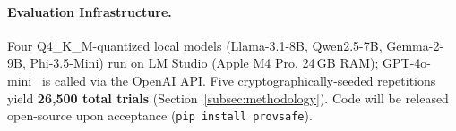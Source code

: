 \paragraph{Evaluation Infrastructure.}
Four Q4\_K\_M-quantized local models (Llama-3.1-8B, Qwen2.5-7B, Gemma-2-9B, Phi-3.5-Mini) run on LM Studio (Apple M4 Pro, 24\,GB RAM); GPT-4o-mini~\cite{openai-gpt4omini} is called via the OpenAI API. Five cryptographically-seeded repetitions yield \textbf{26{,}500 total trials} (Section~\ref{subsec:methodology}). Code will be released open-source upon acceptance (\texttt{pip install provsafe}).

